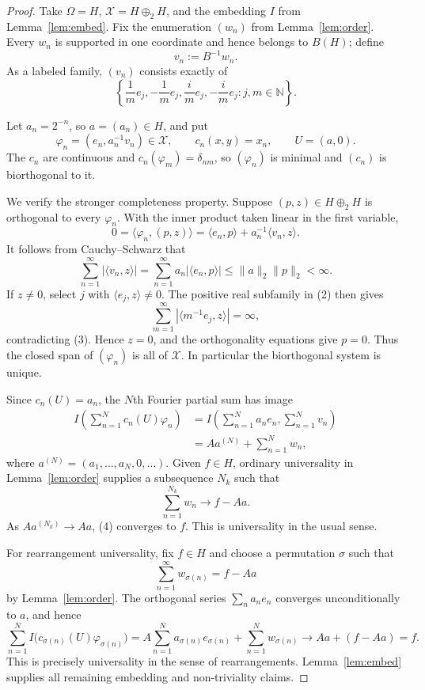 \documentclass[11pt]{article}
\newcommand{\N}{\mathbb N}
\newcommand{\ip}[2]{\langle #1,#2\rangle}
\begin{document}
\begin{proof}
Take $\Omega=H$, $\mathcal X=H\oplus_2H$, and the embedding $I$ from
Lemma~\ref{lem:embed}.  Fix the enumeration $(w_n)$ from
Lemma~\ref{lem:order}.  Every $w_n$ is supported in one coordinate and hence
belongs to $B(H)$; define
\[
  v_n:=B^{-1}w_n.
\]
As a labeled family, $(v_n)$ consists exactly of
\[
  \left\{
  \frac1m e_j,-\frac1m e_j,
  \frac{i}{m}e_j,-\frac{i}{m}e_j:j,m\in\N
  \right\}.                                                   \tag{2}
\]

Let $a_n=2^{-n}$, so $a=(a_n)\in H$, and put
\[
  \varphi_n=(e_n,a_n^{-1}v_n)\in\mathcal X,
  \qquad
  c_n(x,y)=x_n,
  \qquad
  U=(a,0).
\]
The $c_n$ are continuous and
$c_n(\varphi_m)=\delta_{nm}$, so $(\varphi_n)$ is minimal and $(c_n)$ is
biorthogonal to it.

We verify the stronger completeness property.  Suppose $(p,z)\in H\oplus_2H$
is orthogonal to every $\varphi_n$.  With the inner product taken linear in
the first variable,
\[
  0=\ip{\varphi_n}{(p,z)}
   =\ip{e_n}{p}+a_n^{-1}\ip{v_n}{z}.
\]
It follows from Cauchy--Schwarz that
\[
  \sum_{n=1}^\infty|\ip{v_n}{z}|
  =\sum_{n=1}^\infty a_n|\ip{e_n}{p}|
  \leq \|a\|_2\|p\|_2<\infty.                               \tag{3}
\]
If $z\ne0$, select $j$ with $\ip{e_j}{z}\ne0$.  The positive real
subfamily in (2) then gives
\[
  \sum_{m=1}^\infty
    \left|\ip{m^{-1}e_j}{z}\right|=\infty,
\]
contradicting (3).  Hence $z=0$, and the orthogonality equations give
$p=0$.  Thus the closed span of $(\varphi_n)$ is all of $\mathcal X$.
In particular the biorthogonal system is unique.

Since $c_n(U)=a_n$, the $N$th Fourier partial sum has image
\begin{align*}
 I\left(\sum_{n=1}^N c_n(U)\varphi_n\right)
 &=I\left(\sum_{n=1}^Na_ne_n,\sum_{n=1}^Nv_n\right)\\
 &=A a^{(N)}+\sum_{n=1}^Nw_n,                                \tag{4}
\end{align*}
where $a^{(N)}=(a_1,\ldots,a_N,0,\ldots)$.  Given $f\in H$, ordinary
universality in Lemma~\ref{lem:order} supplies a subsequence $N_k$ such that
\[
  \sum_{n=1}^{N_k}w_n\longrightarrow f-Aa.
\]
As $Aa^{(N_k)}\to Aa$, (4) converges to $f$.  This is universality in the
usual sense.

For rearrangement universality, fix $f\in H$ and choose a permutation
$\sigma$ such that
\[
  \sum_{n=1}^\infty w_{\sigma(n)}=f-Aa
\]
by Lemma~\ref{lem:order}.  The orthogonal series
$\sum_na_ne_n$ converges unconditionally to $a$, and hence
\[
 \sum_{n=1}^N I\bigl(c_{\sigma(n)}(U)\varphi_{\sigma(n)}\bigr)
 =A\sum_{n=1}^Na_{\sigma(n)}e_{\sigma(n)}
  +\sum_{n=1}^Nw_{\sigma(n)}
 \longrightarrow Aa+(f-Aa)=f.
\]
This is precisely universality in the sense of rearrangements.
Lemma~\ref{lem:embed} supplies all remaining embedding and non-triviality
claims.
\end{proof}
\end{document}
